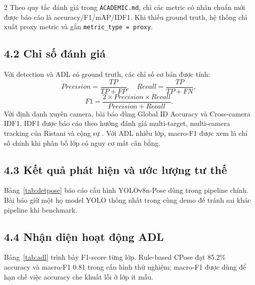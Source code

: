 \documentclass[a4paper, twoside, 10pt]{article}
\begin{document}
\begin{multicols}{2}
Theo quy tắc đánh giá trong \texttt{ACADEMIC.md}, chỉ các metric có nhãn chuẩn mới được báo cáo là accuracy/F1/mAP/IDF1. Khi thiếu ground truth, hệ thống chỉ xuất proxy metric và gắn \texttt{metric\_type = proxy}.

\subsection*{4.2 Chỉ số đánh giá}
Với detection và ADL có ground truth, các chỉ số cơ bản được tính:
\begin{equation}
Precision=\frac{TP}{TP+FP},\quad
Recall=\frac{TP}{TP+FN},
\end{equation}
\begin{equation}
F1=\frac{2\times Precision\times Recall}{Precision+Recall}.
\end{equation}
Với định danh xuyên camera, bài báo dùng Global ID Accuracy và Cross-camera IDF1. IDF1 được báo cáo theo hướng đánh giá multi-target, multi-camera tracking của Ristani và cộng sự \cite{key58}. Với ADL nhiều lớp, macro-F1 được xem là chỉ số chính khi phân bố lớp có nguy cơ mất cân bằng.

\subsection*{4.3 Kết quả phát hiện và ước lượng tư thế}
Bảng~\ref{tab:detpose} báo cáo cấu hình YOLOv8n-Pose dùng trong pipeline chính. Bài báo giữ một họ model YOLO thống nhất trong cùng demo để tránh sai khác pipeline khi benchmark.

\begin{table}[H]
\centering
\caption{Detection \& Pose Benchmark của cấu hình YOLOv8n-Pose}
\label{tab:detpose}
\end{table}

\subsection*{4.4 Nhận diện hoạt động ADL}
Bảng~\ref{tab:adl} trình bày F1-score từng lớp. Rule-based CPose đạt 85.2\% accuracy và macro-F1 0.81 trong cấu hình thử nghiệm; macro-F1 được dùng để hạn chế việc accuracy che khuất lỗi ở lớp ít mẫu.


\end{multicols}
\end{document}
